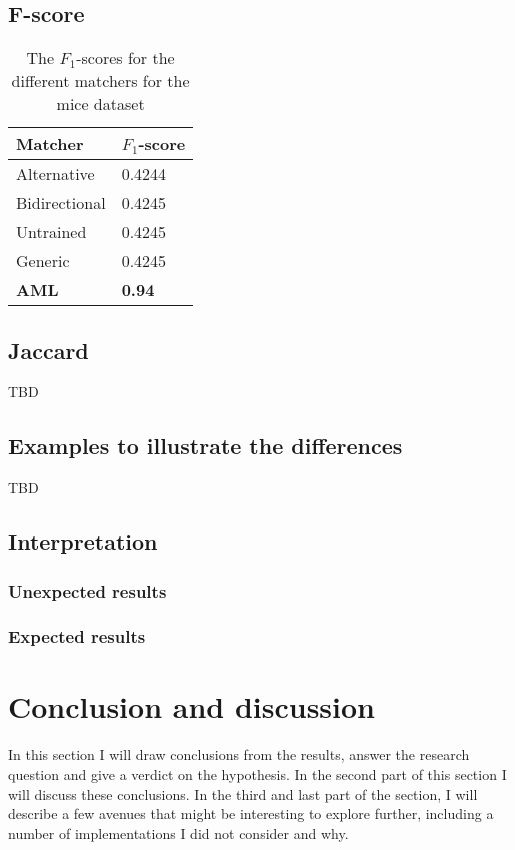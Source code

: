\documentclass{article}
\begin{document}
  \subsection{F-score}
  \begin{table}[H]
  \begin{tabular}{l|l}
  \textbf{Matcher} & \textbf{$F_1$-score}\\
  \hline
  Alternative & 0.4244\\
  Bidirectional & 0.4245\\
  Untrained & 0.4245\\
  Generic & 0.4245\\
  \textbf{AML} & \textbf{0.94}\\ %
  \end{tabular}
  \caption[$F_1$ mice]{The $F_1$-scores for the different matchers for the mice dataset}
  \label{fscores}
  \end{table}
  \subsection{Jaccard}
  TBD
  \subsection{Examples to illustrate the differences}
  TBD
   
 \newpage
 \subsection{Interpretation}
 \subsubsection{Unexpected results}
 \subsubsection{Expected results}
  
 \newpage
 \section{Conclusion and discussion}
 In this section I will draw conclusions from the results, answer the research question and give a verdict on the hypothesis. In the second part of this section I will discuss these conclusions. In the third and last part of the section, I will describe a few avenues that might be interesting to explore further, including a number of implementations I did not consider and why.
 
\end{document}
